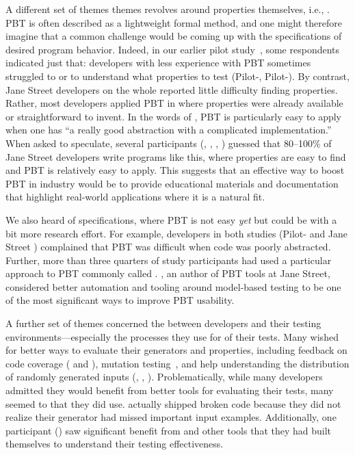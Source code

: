 A different set of themes
themes revolves around properties themselves, i.e.,
.
PBT is often described as a lightweight formal method, and one
might therefore imagine that a common challenge would be coming up with the
specifications of desired program behavior. Indeed, in our earlier pilot
study~\cite{goldstein_problems_2022}, some respondents indicated just that:
developers with less experience with PBT
sometimes struggled to  or to understand what properties to test (Pilot-,
Pilot-).
By contrast, Jane Street developers on the whole reported
little difficulty finding
properties. Rather, most developers applied PBT in
 where properties were already
available or straightforward to invent. In the words of
, PBT is particularly easy to apply
when
one has ``a really good abstraction with a complicated implementation.''
When asked to speculate, several participants (, ,
, ) guessed
that 80--100\% of Jane Street
developers write programs like this,
where properties are easy to find and
PBT is relatively easy to apply. This suggests that an effective way to
boost PBT in industry would be to provide
educational materials and documentation that highlight
real-world applications where it is a natural
fit.

We also heard  of specifications, where PBT is not easy {\em yet} but
could be with a bit more research effort. For example, developers in
both studies (Pilot- and Jane Street ) complained
that PBT was difficult when code was poorly abstracted.  Further,
more than three
quarters of study participants had used a particular approach to PBT commonly
called .  , an author of PBT tools
at Jane Street, considered better automation and tooling around model-based
testing to be one of the most significant ways to improve PBT usability.


A further set of themes concerned the
 between developers and their
testing environments---especially the processes they use
for  of their tests. Many
wished for
better ways to evaluate their generators and properties, including
feedback on code coverage ( and ),
mutation
testing~\cite{papadakis_mutation_2018}, and help understanding the
distribution of randomly generated
inputs (, , ). Problematically,
while many developers admitted they would benefit from better tools for
evaluating their tests, many seemed to
 that they did use.  actually shipped broken code because
they did not realize their generator had missed important input
examples.
Additionally, one participant () saw significant benefit from
 and other tools that they had built themselves to
understand their testing effectiveness.

